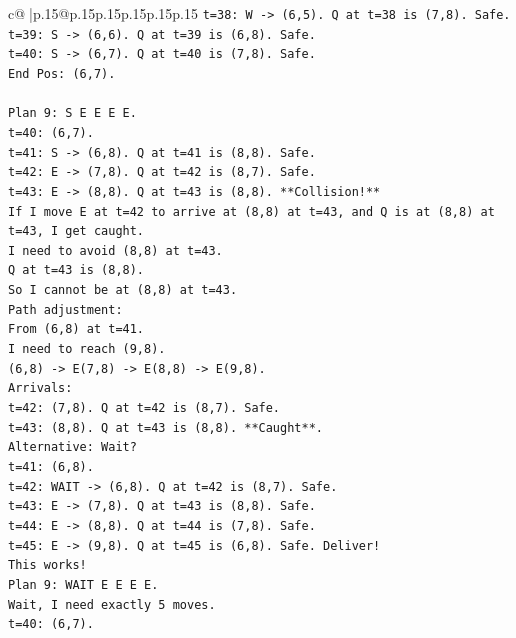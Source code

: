 \documentclass{article}
\begin{document}
{\begin{supertabular}{c@{$\;$}|p{.15\linewidth}@{}p{.15\linewidth}p{.15\linewidth}p{.15\linewidth}p{.15\linewidth}p{.15\linewidth}}
{{{\texttt{t=38: W {-}> (6,5). Q at t=38 is (7,8). Safe.} \\
\texttt{t=39: S {-}> (6,6). Q at t=39 is (6,8). Safe.} \\
\texttt{t=40: S {-}> (6,7). Q at t=40 is (7,8). Safe.} \\
\texttt{End Pos: (6,7).} \\
\\ 
\texttt{Plan 9: S E E E E.} \\
\texttt{t=40: (6,7).} \\
\texttt{t=41: S {-}> (6,8). Q at t=41 is (8,8). Safe.} \\
\texttt{t=42: E {-}> (7,8). Q at t=42 is (8,7). Safe.} \\
\texttt{t=43: E {-}> (8,8). Q at t=43 is (8,8). **Collision!**} \\
\texttt{If I move E at t=42 to arrive at (8,8) at t=43, and Q is at (8,8) at t=43, I get caught.} \\
\texttt{I need to avoid (8,8) at t=43.} \\
\texttt{Q at t=43 is (8,8).} \\
\texttt{So I cannot be at (8,8) at t=43.} \\
\texttt{Path adjustment:} \\
\texttt{From (6,8) at t=41.} \\
\texttt{I need to reach (9,8).} \\
\texttt{(6,8) {-}> E(7,8) {-}> E(8,8) {-}> E(9,8).} \\
\texttt{Arrivals:} \\
\texttt{t=42: (7,8). Q at t=42 is (8,7). Safe.} \\
\texttt{t=43: (8,8). Q at t=43 is (8,8). **Caught**.} \\
\texttt{Alternative: Wait?} \\
\texttt{t=41: (6,8).} \\
\texttt{t=42: WAIT {-}> (6,8). Q at t=42 is (8,7). Safe.} \\
\texttt{t=43: E {-}> (7,8). Q at t=43 is (8,8). Safe.} \\
\texttt{t=44: E {-}> (8,8). Q at t=44 is (7,8). Safe.} \\
\texttt{t=45: E {-}> (9,8). Q at t=45 is (6,8). Safe. Deliver!} \\
\texttt{This works!} \\
\texttt{Plan 9: WAIT E E E E.} \\
\texttt{Wait, I need exactly 5 moves.} \\
\texttt{t=40: (6,7).} \\
}}}
\end{supertabular}}
\end{document}
